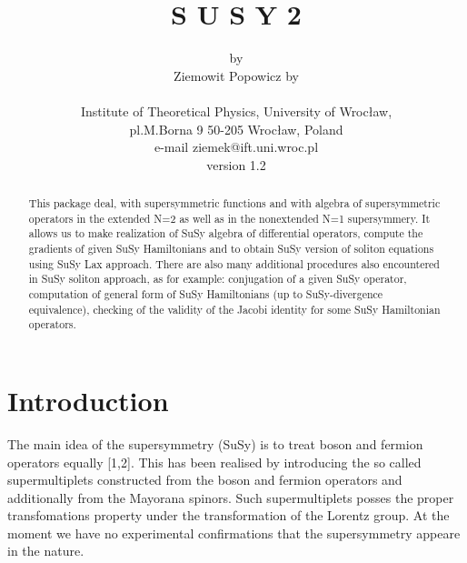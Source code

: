 \def\be{\begin{equation}}
\def\ee{\end{equation}}
\def\pe{\begin{eqnarray}}
\def\ke{\end{eqnarray}}
\topmargin=-2cm\textheight=23.5cm\textwidth=16cm
\oddsidemargin=0.25cm
\evensidemargin=0.25cm



                \title{S U S Y 2}

                \author{by \\
        Ziemowit Popowicz by \\ \\
        Institute of Theoretical Physics, University of Wroc{\l}aw,\\
        pl.M.Borna 9 50-205 Wroc{\l}aw, Poland \\
		e-mail ziemek@ift.uni.wroc.pl \\
                version 1.2}

\maketitle
\begin{abstract}
This package deal, with supersymmetric functions and with algebra
of supersymmetric operators in the extended N=2 as well as in the
nonextended N=1 supersymmery. It allows us
to make  realization of SuSy algebra of differential operators,
compute the gradients of given SuSy Hamiltonians and to obtain
SuSy version of soliton equations using SuSy Lax approach. There
are also many additional procedures also encountered in SuSy soliton
approach, as for example: conjugation of a given SuSy operator, computation
of general form of SuSy Hamiltonians (up to SuSy-divergence equivalence),
checking of the validity of the Jacobi identity for some SuSy
Hamiltonian operators.
\end{abstract}
\section{Introduction}

  The main idea of the supersymmetry (SuSy) is to treat boson and fermion
operators equally [1,2]. This has been realised by introducing the so called
supermultiplets constructed from the boson and fermion operators and
additionally from the Mayorana spinors. Such supermultiplets posses  the
proper transfomations property under the transformation of the Lorentz group.
At the moment we have no experimental confirmations that the supersymmetry
appeare in the nature.

